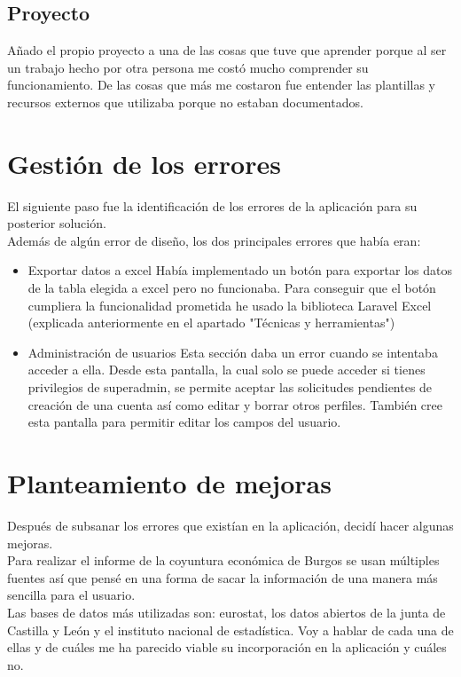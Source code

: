 \subsection{Proyecto}
Añado el propio proyecto a una de las cosas que tuve que aprender porque al ser un trabajo hecho por otra persona me costó mucho comprender su funcionamiento. De las cosas que más me costaron fue entender las plantillas y recursos externos que utilizaba porque no estaban documentados.
\section{Gestión de los errores}
El siguiente paso fue la identificación de los errores de la aplicación para su posterior solución.\\
Además de algún error de diseño, los dos principales errores que había eran:
\begin{itemize}
    \item {Exportar datos a excel} Había implementado un botón para exportar los datos de la tabla elegida a excel pero no funcionaba. Para conseguir que el botón cumpliera la funcionalidad prometida he usado la biblioteca Laravel Excel (explicada anteriormente en el apartado "Técnicas y herramientas")
    \item{Administración de usuarios} Esta sección daba un error cuando se intentaba acceder a ella.
    Desde esta pantalla, la cual solo se puede acceder si tienes privilegios de superadmin, se permite aceptar las solicitudes pendientes de creación de una cuenta así como editar y borrar otros perfiles.
    También cree esta pantalla para permitir editar los campos del usuario.
\end{itemize}
\section{Planteamiento de mejoras}
Después de subsanar los errores que existían en la aplicación, decidí hacer algunas mejoras.\\
Para realizar el informe de la coyuntura económica de Burgos se usan múltiples fuentes así que pensé en una forma de sacar la información de una manera más sencilla para el usuario.\\
Las bases de datos más utilizadas son: eurostat, los datos abiertos de la junta de Castilla y León y el instituto nacional de estadística. Voy a hablar de cada una de ellas y de cuáles me ha parecido viable su incorporación en la aplicación y cuáles no.
